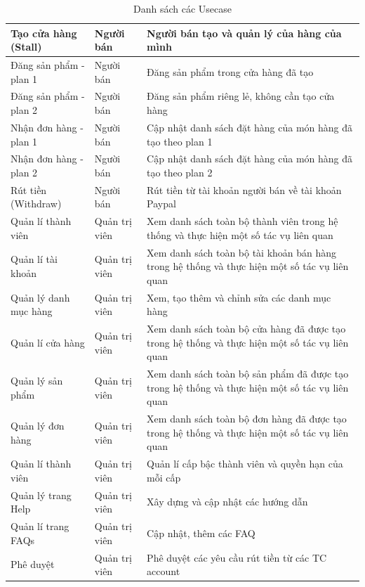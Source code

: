 \begin{table}[H]
\begin{tabularx}{\textwidth}{|l|>{\raggedright\arraybackslash}X|>{\raggedright\arraybackslash}X |}
		 Tạo cửa hàng (Stall)&Người bán&Người bán tạo và quản lý của hàng của mình\\ \hline
		 
		 Đăng sản phẩm - plan 1&Người bán&Đăng sản phẩm trong cửa hàng đã tạo\\
		 \hline
		 
		 Đăng sản phẩm - plan 2&Người bán&Đăng sản phẩm riêng lẻ, không cần tạo cửa hàng\\ \hline
		 
		Nhận đơn hàng - plan 1&Người bán&Cập nhật danh sách đặt hàng của món hàng đã tạo theo plan 1\\ \hline
		
		Nhận đơn hàng - plan 2&Người bán&Cập nhật danh sách đặt hàng của món hàng đã tạo theo plan 2\\ \hline
		
		Rút tiền (Withdraw)&Người bán&Rút tiền từ tài khoản người bán về tài khoản Paypal\\ \hline
		
		Quản lí thành viên&Quản trị viên&Xem danh sách toàn bộ thành viên trong hệ thống và thực hiện một số tác vụ liên quan\\ \hline
		
		Quản lí tài khoản&Quản trị viên&Xem danh sách toàn bộ tài khoản bán hàng trong hệ thống và thực hiện một số tác vụ liên quan\\ \hline
		
		Quản lý danh mục hàng&Quản trị viên&Xem, tạo thêm và chỉnh sửa các danh mục hàng\\ \hline
		
		Quản lí cửa hàng&Quản trị viên&Xem danh sách toàn bộ cửa hàng đã được tạo trong hệ thống và thực hiện một số tác vụ liên quan\\ \hline
				
		Quản lý sản phẩm&Quản trị viên&Xem danh sách toàn bộ sản phẩm đã được tạo trong hệ thống và thực hiện một số tác vụ liên quan\\ \hline
		
		Quản lý đơn hàng&Quản trị viên&Xem danh sách toàn bộ đơn hàng đã được tạo trong hệ thống và thực hiện một số tác vụ liên quan\\ \hline
		
		Quản lí thành viên&Quản trị viên&Quản lí cấp bậc thành viên và quyền hạn của mỗi cấp\\ \hline
		
		Quản lý trang Help&Quản trị viên&Xây dựng và cập nhật các hướng dẫn\\ \hline
		
		Quản lí trang FAQs&Quản trị viên&Cập nhật, thêm các FAQ\\ \hline
		
		Phê duyệt&Quản trị viên&Phê duyệt các yêu cầu rút tiền từ các TC account\\ \hline
	\end{tabularx}
	\caption{Danh sách các Usecase}
\end{table}


